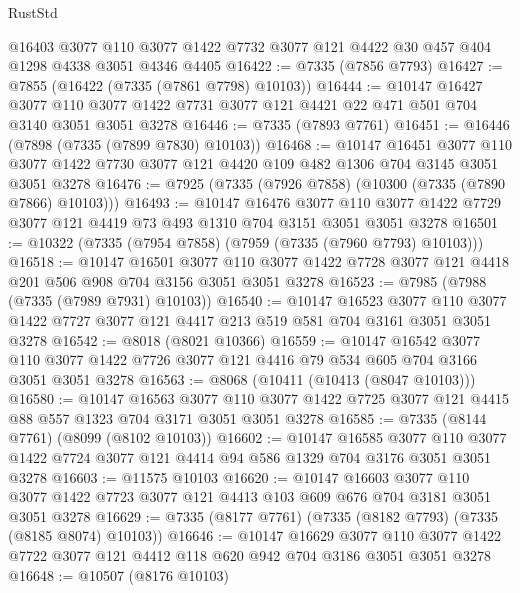 \begin{lexlean}{RustStd}
\begin{coremodule}
    @16403
    @3077
    @110
    @3077
    @1422
    @7732
    @3077
    @121
    @4422
    @30
    @457
    @404
    @1298
    @4338
    @3051
    @4346
    @4405
@16422 := @7335 (@7856 @7793)
@16427 := @7855 (@16422 (@7335 (@7861 @7798) @10103))
@16444 := @10147
    @16427
    @3077
    @110
    @3077
    @1422
    @7731
    @3077
    @121
    @4421
    @22
    @471
    @501
    @704
    @3140
    @3051
    @3051
    @3278
@16446 := @7335 (@7893 @7761)
@16451 := @16446 (@7898 (@7335 (@7899 @7830) @10103))
@16468 := @10147
    @16451
    @3077
    @110
    @3077
    @1422
    @7730
    @3077
    @121
    @4420
    @109
    @482
    @1306
    @704
    @3145
    @3051
    @3051
    @3278
@16476 := @7925 (@7335 (@7926 @7858) (@10300 (@7335 (@7890 @7866) @10103)))
@16493 := @10147
    @16476
    @3077
    @110
    @3077
    @1422
    @7729
    @3077
    @121
    @4419
    @73
    @493
    @1310
    @704
    @3151
    @3051
    @3051
    @3278
@16501 := @10322 (@7335 (@7954 @7858) (@7959 (@7335 (@7960 @7793) @10103)))
@16518 := @10147
    @16501
    @3077
    @110
    @3077
    @1422
    @7728
    @3077
    @121
    @4418
    @201
    @506
    @908
    @704
    @3156
    @3051
    @3051
    @3278
@16523 := @7985 (@7988 (@7335 (@7989 @7931) @10103))
@16540 := @10147
    @16523
    @3077
    @110
    @3077
    @1422
    @7727
    @3077
    @121
    @4417
    @213
    @519
    @581
    @704
    @3161
    @3051
    @3051
    @3278
@16542 := @8018 (@8021 @10366)
@16559 := @10147
    @16542
    @3077
    @110
    @3077
    @1422
    @7726
    @3077
    @121
    @4416
    @79
    @534
    @605
    @704
    @3166
    @3051
    @3051
    @3278
@16563 := @8068 (@10411 (@10413 (@8047 @10103)))
@16580 := @10147
    @16563
    @3077
    @110
    @3077
    @1422
    @7725
    @3077
    @121
    @4415
    @88
    @557
    @1323
    @704
    @3171
    @3051
    @3051
    @3278
@16585 := @7335 (@8144 @7761) (@8099 (@8102 @10103))
@16602 := @10147
    @16585
    @3077
    @110
    @3077
    @1422
    @7724
    @3077
    @121
    @4414
    @94
    @586
    @1329
    @704
    @3176
    @3051
    @3051
    @3278
@16603 := @11575 @10103
@16620 := @10147
    @16603
    @3077
    @110
    @3077
    @1422
    @7723
    @3077
    @121
    @4413
    @103
    @609
    @676
    @704
    @3181
    @3051
    @3051
    @3278
@16629 := @7335 (@8177 @7761) (@7335 (@8182 @7793) (@7335 (@8185 @8074) @10103))
@16646 := @10147
    @16629
    @3077
    @110
    @3077
    @1422
    @7722
    @3077
    @121
    @4412
    @118
    @620
    @942
    @704
    @3186
    @3051
    @3051
    @3278
@16648 := @10507 (@8176 @10103)

\end{coremodule}
\end{lexlean}
